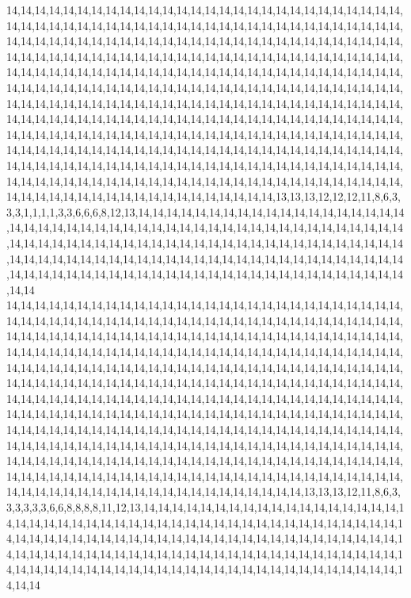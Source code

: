 14,14,14,14,14,14,14,14,14,14,14,14,14,14,14,14,14,14,14,14,14,14,14,14,14,14,14,14,14,14,14,14,14,14,14,14,14,14,14,14,14,14,14,14,14,14,14,14,14,14,14,14,14,14,14,14,14,14,14,14,14,14,14,14,14,14,14,14,14,14,14,14,14,14,14,14,14,14,14,14,14,14,14,14,14,14,14,14,14,14,14,14,14,14,14,14,14,14,14,14,14,14,14,14,14,14,14,14,14,14,14,14,14,14,14,14,14,14,14,14,14,14,14,14,14,14,14,14,14,14,14,14,14,14,14,14,14,14,14,14,14,14,14,14,14,14,14,14,14,14,14,14,14,14,14,14,14,14,14,14,14,14,14,14,14,14,14,14,14,14,14,14,14,14,14,14,14,14,14,14,14,14,14,14,14,14,14,14,14,14,14,14,14,14,14,14,14,14,14,14,14,14,14,14,14,14,14,14,14,14,14,14,14,14,14,14,14,14,14,14,14,14,14,14,14,14,14,14,14,14,14,14,14,14,14,14,14,14,14,14,14,14,14,14,14,14,14,14,14,14,14,14,14,14,14,14,14,14,14,14,14,14,14,14,14,14,14,14,14,14,14,14,14,14,14,14,14,14,14,14,14,14,14,14,14,14,14,14,14,14,14,14,14,14,14,14,14,14,14,14,14,14,14,14,14,14,14,14,14,14,14,14,14,14,14,14,14,14,14,14,14,14,14,14,14,14,14,14,14,14,14,14,14,14,14,14,14,14,14,14,14,14,14,14,14,14,14,14,14,14,14,14,14,14,14,13,13,13,12,12,12,11,8,6,3,3,3,1,1,1,1,3,3,6,6,6,8,12,13,14,14,14,14,14,14,14,14,14,14,14,14,14,14,14,14,14,14,14,14,14,14,14,14,14,14,14,14,14,14,14,14,14,14,14,14,14,14,14,14,14,14,14,14,14,14,14,14,14,14,14,14,14,14,14,14,14,14,14,14,14,14,14,14,14,14,14,14,14,14,14,14,14,14,14,14,14,14,14,14,14,14,14,14,14,14,14,14,14,14,14,14,14,14,14,14,14,14,14,14,14,14,14,14,14,14,14,14,14,14,14,14,14,14,14,14,14,14,14,14,14,14,14,14,14,14,14,14,14,14,14,14,14
14,14,14,14,14,14,14,14,14,14,14,14,14,14,14,14,14,14,14,14,14,14,14,14,14,14,14,14,14,14,14,14,14,14,14,14,14,14,14,14,14,14,14,14,14,14,14,14,14,14,14,14,14,14,14,14,14,14,14,14,14,14,14,14,14,14,14,14,14,14,14,14,14,14,14,14,14,14,14,14,14,14,14,14,14,14,14,14,14,14,14,14,14,14,14,14,14,14,14,14,14,14,14,14,14,14,14,14,14,14,14,14,14,14,14,14,14,14,14,14,14,14,14,14,14,14,14,14,14,14,14,14,14,14,14,14,14,14,14,14,14,14,14,14,14,14,14,14,14,14,14,14,14,14,14,14,14,14,14,14,14,14,14,14,14,14,14,14,14,14,14,14,14,14,14,14,14,14,14,14,14,14,14,14,14,14,14,14,14,14,14,14,14,14,14,14,14,14,14,14,14,14,14,14,14,14,14,14,14,14,14,14,14,14,14,14,14,14,14,14,14,14,14,14,14,14,14,14,14,14,14,14,14,14,14,14,14,14,14,14,14,14,14,14,14,14,14,14,14,14,14,14,14,14,14,14,14,14,14,14,14,14,14,14,14,14,14,14,14,14,14,14,14,14,14,14,14,14,14,14,14,14,14,14,14,14,14,14,14,14,14,14,14,14,14,14,14,14,14,14,14,14,14,14,14,14,14,14,14,14,14,14,14,14,14,14,14,14,14,14,14,14,14,14,14,14,14,14,14,14,14,14,14,14,14,14,14,14,14,14,14,14,14,14,14,14,14,14,14,14,14,14,14,14,14,14,14,13,13,13,12,11,8,6,3,3,3,3,3,3,6,6,8,8,8,8,11,12,13,14,14,14,14,14,14,14,14,14,14,14,14,14,14,14,14,14,14,14,14,14,14,14,14,14,14,14,14,14,14,14,14,14,14,14,14,14,14,14,14,14,14,14,14,14,14,14,14,14,14,14,14,14,14,14,14,14,14,14,14,14,14,14,14,14,14,14,14,14,14,14,14,14,14,14,14,14,14,14,14,14,14,14,14,14,14,14,14,14,14,14,14,14,14,14,14,14,14,14,14,14,14,14,14,14,14,14,14,14,14,14,14,14,14,14,14,14,14,14,14,14,14,14,14,14,14,14,14,14,14,14,14,14
